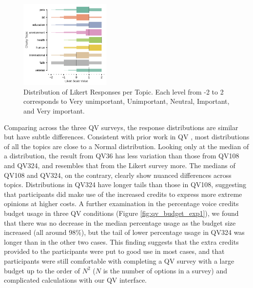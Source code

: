 \begin{figure}[htpb]
    \centering
    \includegraphics[width=0.4\textwidth, keepaspectratio=true]{content/image/likert_distribution_per_topic.pdf}
    \caption{
      Distribution of Likert Responses per Topic. Each level from -2 to 2 corresponds to Very unimportant, Unimportant, Neutral, Important, and Very important.
    }
    \label{fig:likert_exp1}
\end{figure}

Comparing across the three QV surveys, the response distributions are similar but have subtle differences. Consistent with prior work in QV \cite{quarfoot2017quadratic}, most distributions of all the topics are close to a Normal distribution. Looking only at the median of a distribution, the result from QV36 has less variation than those from QV108 and QV324, and resembles that from the Likert survey more. The medians of QV108 and QV324, on the contrary, clearly show nuanced differences across topics. Distributions in QV324 have longer tails than those in QV108, suggesting that participants did make use of the increased credits to express more extreme opinions at higher costs. A further examination in the percentage voice credits budget usage in three QV conditions (Figure \ref{fig:qv_budget_exp1}), we found that there was no decrease in the median percentage usage as the budget size increased (all around 98\%), but the tail of lower percentage usage in QV324 was longer than in the other two cases. This finding suggests that the extra credits provided to the participants were put to good use in most cases, and that participants were still comfortable with completing a QV survey with a large budget up to the order of $N^2$ ($N$ is the number of options in a survey) and complicated calculations with our QV interface. %

